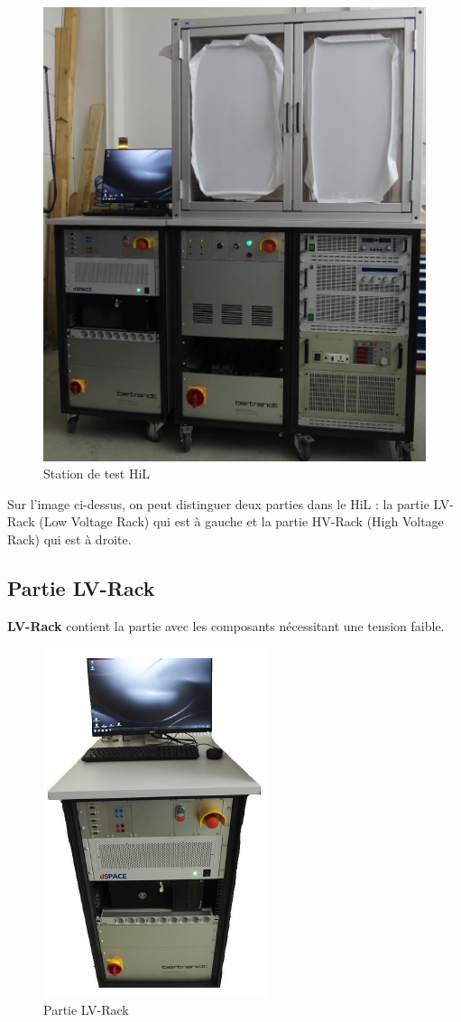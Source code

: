 \begin{figure}[H]
 \centering
 \includegraphics[scale=0.8]{images/hil}
 \caption{Station de test HiL}
\end{figure}

Sur l’image ci-dessus, on peut distinguer deux parties dans le HiL : la partie LV-Rack (Low Voltage Rack) qui est à gauche et la partie HV-Rack (High Voltage Rack) qui est à droite.

\subsection{Partie LV-Rack}

\textbf{LV-Rack} contient la partie avec les composants nécessitant une tension faible.

\begin{figure}[H]
 \centering
 \includegraphics[scale=1]{images/lv_rack}
 \caption{Partie LV-Rack}
\end{figure}

